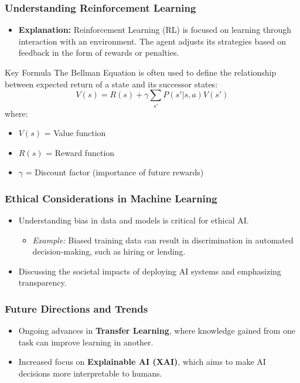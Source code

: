 \documentclass[aspectratio=169]{beamer}
\begin{document}
\begin{frame}[fragile]
    \frametitle{Understanding Reinforcement Learning}
    \begin{itemize}
        \item \textbf{Explanation:} 
        Reinforcement Learning (RL) is focused on learning through interaction with an environment. The agent adjusts its strategies based on feedback in the form of rewards or penalties.
    \end{itemize}
    \begin{block}{Key Formula}
        The Bellman Equation is often used to define the relationship between expected return of a state and its successor states:
        \begin{equation}
            V(s) = R(s) + \gamma \sum_{s'} P(s' | s, a)V(s')
        \end{equation}
        where:
        \begin{itemize}
            \item \( V(s) \) = Value function
            \item \( R(s) \) = Reward function
            \item \( \gamma \) = Discount factor (importance of future rewards)
        \end{itemize}
    \end{block}
\end{frame}

\begin{frame}[fragile]
    \frametitle{Ethical Considerations in Machine Learning}
    \begin{itemize}
        \item Understanding bias in data and models is critical for ethical AI.
        \begin{itemize}
            \item \textit{Example:} Biased training data can result in discrimination in automated decision-making, such as hiring or lending.
        \end{itemize}
        \item Discussing the societal impacts of deploying AI systems and emphasizing transparency.
    \end{itemize}
\end{frame}

\begin{frame}[fragile]
    \frametitle{Future Directions and Trends}
    \begin{itemize}
        \item Ongoing advances in \textbf{Transfer Learning}, where knowledge gained from one task can improve learning in another.
        \item Increased focus on \textbf{Explainable AI (XAI)}, which aims to make AI decisions more interpretable to humans.
    \end{itemize}
\end{frame}
\end{document}
